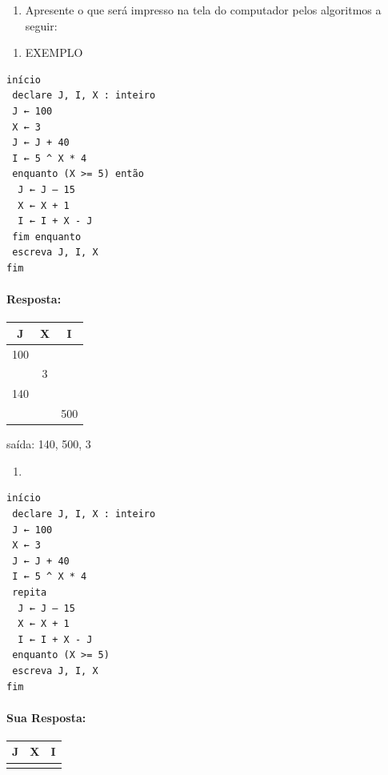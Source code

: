 \documentclass[12pt,a4paper]{article}
\providecommand{\tightlist}{%
      \setlength{\itemsep}{0pt}\setlength{\parskip}{0pt}}
\begin{document}
\begin{enumerate}
\def\labelenumi{\arabic{enumi}.}
\setcounter{enumi}{3}
\tightlist
\item
  Apresente o que será impresso na tela do computador pelos algoritmos a
  seguir:
\end{enumerate}

\begin{enumerate}
\def\labelenumi{\alph{enumi})}
\tightlist
\item
  EXEMPLO
\end{enumerate}

\begin{verbatim}
início
 declare J, I, X : inteiro
 J ← 100
 X ← 3
 J ← J + 40
 I ← 5 ^ X * 4
 enquanto (X >= 5) então
  J ← J – 15
  X ← X + 1
  I ← I + X - J
 fim enquanto
 escreva J, I, X
fim
\end{verbatim}

    \hypertarget{resposta}{%
\paragraph{Resposta:}\label{resposta}}

\begin{longtable}[]{@{}ccc@{}}
\toprule
J & X & I\tabularnewline
\midrule
\endhead
100 & &\tabularnewline
& 3 &\tabularnewline
140 & &\tabularnewline
& & 500\tabularnewline
\bottomrule
\end{longtable}

saída: 140, 500, 3

    \begin{enumerate}
\def\labelenumi{\alph{enumi})}
\setcounter{enumi}{1}
\item
\end{enumerate}

\begin{verbatim}
início
 declare J, I, X : inteiro
 J ← 100
 X ← 3
 J ← J + 40
 I ← 5 ^ X * 4
 repita
  J ← J – 15
  X ← X + 1
  I ← I + X - J
 enquanto (X >= 5)
 escreva J, I, X
fim
\end{verbatim}

    \hypertarget{sua-resposta}{%
\paragraph{Sua Resposta:}\label{sua-resposta}}

\begin{longtable}[]{@{}ccc@{}}
\toprule
J & X & I\tabularnewline
\midrule
\endhead
& &\tabularnewline
\bottomrule
\end{longtable}
\end{document}
